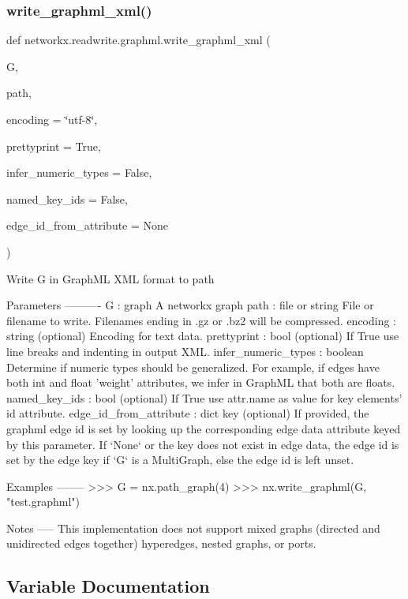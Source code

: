 \subsubsection{\texorpdfstring{write\+\_\+graphml\+\_\+xml()}{write\_graphml\_xml()}}
{\footnotesize\ttfamily def networkx.\+readwrite.\+graphml.\+write\+\_\+graphml\+\_\+xml (\begin{DoxyParamCaption}\item[{}]{G,  }\item[{}]{path,  }\item[{}]{encoding = {\ttfamily \char`\"{}utf-\/8\char`\"{}},  }\item[{}]{prettyprint = {\ttfamily True},  }\item[{}]{infer\+\_\+numeric\+\_\+types = {\ttfamily False},  }\item[{}]{named\+\_\+key\+\_\+ids = {\ttfamily False},  }\item[{}]{edge\+\_\+id\+\_\+from\+\_\+attribute = {\ttfamily None} }\end{DoxyParamCaption})}

\begin{DoxyVerb}Write G in GraphML XML format to path

Parameters
----------
G : graph
   A networkx graph
path : file or string
   File or filename to write.
   Filenames ending in .gz or .bz2 will be compressed.
encoding : string (optional)
   Encoding for text data.
prettyprint : bool (optional)
   If True use line breaks and indenting in output XML.
infer_numeric_types : boolean
   Determine if numeric types should be generalized.
   For example, if edges have both int and float 'weight' attributes,
   we infer in GraphML that both are floats.
named_key_ids : bool (optional)
   If True use attr.name as value for key elements' id attribute.
edge_id_from_attribute : dict key (optional)
    If provided, the graphml edge id is set by looking up the corresponding
    edge data attribute keyed by this parameter. If `None` or the key does not exist in edge data,
    the edge id is set by the edge key if `G` is a MultiGraph, else the edge id is left unset.

Examples
--------
>>> G = nx.path_graph(4)
>>> nx.write_graphml(G, "test.graphml")

Notes
-----
This implementation does not support mixed graphs (directed
and unidirected edges together) hyperedges, nested graphs, or ports.
\end{DoxyVerb}
 

\subsection{Variable Documentation}
\mbox{\label{namespacenetworkx_1_1readwrite_1_1graphml_afaaee57deeaba21fc4c70f107fe39da1}} 
